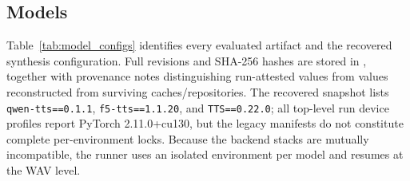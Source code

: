\documentclass[11pt]{article}
\begin{document}
\subsection{Models}

Table~\ref{tab:model_configs} identifies every evaluated artifact and the recovered synthesis configuration. Full revisions and SHA-256 hashes are stored in , together with provenance notes distinguishing run-attested values from values reconstructed from surviving caches/repositories. The recovered snapshot lists \texttt{qwen-tts==0.1.1}, \texttt{f5-tts==1.1.20}, and \texttt{TTS==0.22.0}; all top-level run device profiles report PyTorch 2.11.0+cu130, but the legacy manifests do not constitute complete per-environment locks. Because the backend stacks are mutually incompatible, the runner uses an isolated environment per model and resumes at the WAV level.
\end{document}
